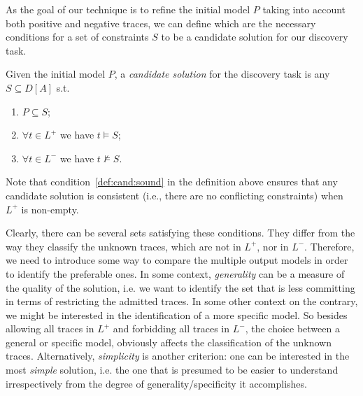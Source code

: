  As the goal of our technique is to refine the initial model $P$ taking into account both positive and negative traces, we can define which are the necessary conditions for a set of constraints $S$ to be a candidate solution for our discovery task.

\theoremstyle{definition}
\begin{definition}{}\label{def:cand}
Given the initial model $P$, a \emph{candidate solution} for the discovery task is any $S\subseteq D[A]$ s.t.
\begin{enumerate} [label=\textit{(\roman*)}]
  \item $P\subseteq S$;
  \item $\forall t\in L^+$ we have $t\models S$;\label{def:cand:sound}
  \item $\forall t\in L^-$ we have $t\not\models S$.
\end{enumerate}
\end{definition}


Note that condition~\ref{def:cand:sound} in the definition above ensures that any candidate solution is consistent (i.e., there are no conflicting constraints) when ${L^+}$ is non-empty.

 Clearly, there can be several sets satisfying these conditions. They differ from the way they classify the unknown traces, which are not in $L^+$, nor in $L^-$. Therefore, we need to introduce some way to compare the multiple output models in order to identify the preferable ones.
%
In some context, \emph{generality} can be a measure of the quality of the solution, i.e. we want to identify the set that is less committing in terms of restricting the admitted traces. In some other context on the contrary, we might be interested in the identification of a more specific model. So besides allowing all traces in $L^+$ and forbidding all traces in $L^-$, the choice between a general or specific model, obviously affects the classification of the unknown traces. Alternatively, \emph{simplicity} is another criterion: one can be interested in the most \emph{simple} solution, i.e. the one that is presumed to be easier to understand irrespectively from the degree of generality/specificity it accomplishes.

